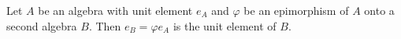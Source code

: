 Let $A$ be an algebra with unit element $e_A$ and $\varphi$ be an epimorphism of $A$ onto a second algebra $B$. Then $e_B = \varphi e_A$ is the unit element of $B$.
